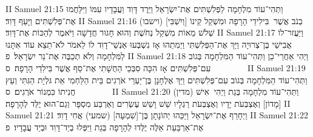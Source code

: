 II Samuel 21:15	וַתְּהִי־עוֹד מִלְחָמָה לַפְּלִשְׁתִּים אֶת־יִשְׂרָאֵל וַיֵּרֶד דָּוִד וַעֲבָדָיו עִמּוֹ וַיִּלָּחֲמוּ אֶת־פְּלִשְׁתִּים וַיָּעַף דָּוִד׃
II Samuel 21:16	(וישבו) [וְיִשְׁבִּי] בְנֹב אֲשֶׁר  בִּילִידֵי הָרָפָה וּמִשְׁקַל קֵינוֹ שְׁלֹשׁ מֵאוֹת מִשְׁקַל נְחֹשֶׁת וְהוּא חָגוּר חֲדָשָׁה וַיֹּאמֶר לְהַכּוֹת אֶת־דָּוִד׃
II Samuel 21:17	וַיַּעֲזר־לוֹ אֲבִישַׁי בֶּן־צְרוּיָה וַיַּךְ אֶת־הַפְּלִשְׁתִּי וַיְמִתֵהוּ אָז נִשְׁבְּעוּ אַנְשֵׁי־דָוִד לוֹ לֵאמֹר לֹא־תֵצֵא עוֹד אִתָּנוּ לַמִּלְחָמָה וְלֹא תְכַבֶּה אֶת־נֵר יִשְׂרָאֵל׃ {פ}
II Samuel 21:18	וַיְהִי אַחֲרֵי־כֵן וַתְּהִי־עוֹד הַמִּלְחָמָה בְּגוֹב עִם־פְּלִשְׁתִּים אָז הִכָּה סִבְּכַי הַחֻשָׁתִי אֶת־סַף אֲשֶׁר בִּילִדֵי הָרָפָה׃ {ס}        
II Samuel 21:19	וַתְּהִי־עוֹד הַמִּלְחָמָה בְּגוֹב עִם־פְּלִשְׁתִּים וַיַּךְ אֶלְחָנָן בֶּן־יַעְרֵי אֹרְגִים בֵּית הַלַּחְמִי אֵת גּלְיָת הַגִּתִּי וְעֵץ חֲנִיתוֹ כִּמְנוֹר אֹרְגִים׃ {ס}        
II Samuel 21:20	וַתְּהִי־עוֹד מִלְחָמָה בְּגַת וַיְהִי  אִישׁ (מדין) [מָדוֹן] וְאֶצְבְּעֹת יָדָיו וְאֶצְבְּעֹת רַגְלָיו שֵׁשׁ וָשֵׁשׁ עֶשְׂרִים וְאַרְבַּע מִסְפָּר וְגַם־הוּא יֻלַּד לְהָרָפָה׃
II Samuel 21:21	וַיְחָרֵף אֶת־יִשְׂרָאֵל וַיַּכֵּהוּ יְהוֹנָתָן בֶּן־[שִׁמְעָה] (שמעי) אֲחִי דָוִד׃
II Samuel 21:22	אֶת־אַרְבַּעַת אֵלֶּה יֻלְּדוּ לְהָרָפָה בְּגַת וַיִּפְּלוּ בְיַד־דָּוִד וּבְיַד עֲבָדָיו׃ {פ}
